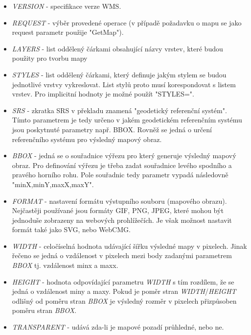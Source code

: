 \begin{itemize}
\item\textit{VERSION} - specifikace verze WMS.
	
\item\textit{REQUEST} - výběr provedené operace (v případě požadavku o
  mapu se jako request parametr použije "GetMap").

\item\textit{LAYERS} - list oddělený čárkami obsahující názvy vrstev,
  které budou použity pro tvorbu mapy

\item\textit{STYLES} - list oddělený čárkami, který definuje jakým
  stylem se budou jednotlivé vrstvy vykreslovat. List stylů proto musí
  korespondovat s listem vrstev. Pro implicitní hodnoty je možné
  použít "STYLES=".
	
\item\textit{SRS} - zkratka SRS v překladu znamená "geodetický
  referenční systém". Tímto parametrem je tedy určeno v jakém
  geodetickém referenčním systému jsou poskytnuté parametry
  např. BBOX. Rovněž se jedná o určení referenčního systému pro
  výsledný mapový obraz.

\item\textit{BBOX} - jedná se o souřadnice výřezu pro který generuje
  výsledný mapový obraz. Pro definování výřezu je třeba zadat
  souřadnice levého spodního a pravého horního rohu. Pole souřadnic
  tedy parametr vypadá následovně "minX,minY,maxX,maxY".
	
\item\textit{FORMAT} - nastavení formátu výstupního souboru (mapového
  obrazu). Nejčastěji používané jsou formáty GIF, PNG, JPEG, které
  mohou být jednoduše zobrazeny na webových prohlížečích. Je však
  možnost nastavit formát také jako SVG, nebo WebCMG.
	
\item\textit{WIDTH} - celočíselná hodnota udávající šířku výsledné
  mapy v pixelech. Jinak řečeno se jedná o vzdálenost v pixelech mezi
  body zadanými parametrem \textit{BBOX} tj. vzdálenost minx a maxx.
	
\item\textit{HEIGHT} - hodnota odpovídající parametru \textit{WIDTH} s
  tím rozdílem, že se jedná o vzdálenost miny a maxy. Pokud je poměr
  stran \textit{WIDTH}/\textit{HEIGHT} odlišný od poměru stran
  \textit{BBOX} je výsledný rozměr v pixelech přizpůsoben poměru stran
  \textit{BBOX}.
	
\item\textit{TRANSPARENT} - udává zda-li je mapové pozadí průhledné,
  nebo ne.
\end{itemize}

